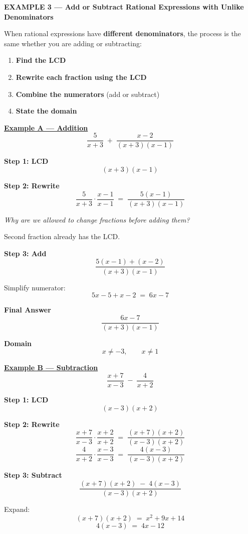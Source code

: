 \documentclass[11pt]{article}
\newcommand{\examplehead}[1]{%
  \bigskip\noindent%
  \begin{tcolorbox}[colback=examplebg,colframe=examplebg,boxrule=0pt,
                    left=5pt,right=5pt,top=3pt,bottom=3pt,arc=1pt]%
    \large\bfseries #1%
  \end{tcolorbox}\smallskip}
\newcommand{\sidequestion}[1]{%
  \smallskip\noindent\textit{\small #1}\par}
\begin{document}
\examplehead{EXAMPLE 3 --- Add or Subtract Rational Expressions with Unlike Denominators}

When rational expressions have \textbf{different denominators}, the process is
the same whether you are adding or subtracting:
\begin{enumerate}
  \item \textbf{Find the LCD}
  \item \textbf{Rewrite each fraction using the LCD}
  \item \textbf{Combine the numerators} (add or subtract)
  \item \textbf{State the domain}
\end{enumerate}

\smallskip
\underline{\textbf{Example A --- Addition}}
\[ \frac{5}{x+3} \;+\; \frac{x-2}{(x+3)(x-1)} \]

\textbf{Step 1: LCD}
\[ (x+3)(x-1) \]

\textbf{Step 2: Rewrite}
\[ \frac{5}{x+3} \cdot \frac{x-1}{x-1} \;=\; \frac{5(x-1)}{(x+3)(x-1)} \]

\sidequestion{Why are we allowed to change fractions before adding them?}
\vspace{1.2cm}

Second fraction already has the LCD.

\textbf{Step 3: Add}
\[ \frac{5(x-1) + (x-2)}{(x+3)(x-1)} \]

Simplify numerator:
\[ 5x - 5 + x - 2 \;=\; 6x - 7 \]

\textbf{Final Answer}
\[ \frac{6x-7}{(x+3)(x-1)} \]

\textbf{Domain}
\[ x \neq -3, \qquad x \neq 1 \]

\bigskip
\underline{\textbf{Example B --- Subtraction}}
\[ \frac{x+7}{x-3} \;-\; \frac{4}{x+2} \]

\textbf{Step 1: LCD}
\[ (x-3)(x+2) \]

\textbf{Step 2: Rewrite}
\[ \frac{x+7}{x-3} \cdot \frac{x+2}{x+2} \;=\; \frac{(x+7)(x+2)}{(x-3)(x+2)} \]
\[ \frac{4}{x+2} \cdot \frac{x-3}{x-3} \;=\; \frac{4(x-3)}{(x-3)(x+2)} \]

\textbf{Step 3: Subtract}
\[ \frac{(x+7)(x+2) \;-\; 4(x-3)}{(x-3)(x+2)} \]

Expand:
\[ (x+7)(x+2) \;=\; x^{2} + 9x + 14 \]
\[ 4(x-3) \;=\; 4x - 12 \]
\end{document}
